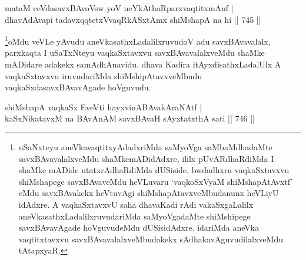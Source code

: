 \begin{shl}
mataM ceVdasavxBAvoV\s sw yoV neYkAthaRparxvaqtitxmAnf | \\
dhavAdAvapi tadavxqqtetxVvaqRkASxtAmx shiMshapA na hi \hfill||  745 ||  
\end{shl}

\begin{artha}
\footnote{uSaNxteyu aneVkavaqtitxyAdadxriMda saMyoVga saMbaMdhadaMte savxBAvavalalxveMdu shaMkemADidAdxre, ililx pUvARdhaRdiMda I shaMke mADide utatxrAdhaRdiMda dUSiside. bwdadhxru vaqkaSxtavxvu shiMshapege savxBAvaveMdu heVLuvaru `vaqkoSxV\s yaM shiMshapAtAvxtf' eMdu savxBAvakekx heVtuvAgi shiMshapAtavxveMbudanunx heVLiyU idAdxre. A vaqkaSxtavxvU saha dhavaKadi rAdi vakaSxgaLalilx aneVkasathxLadalilxruvudariMda saMyoVgadaMte shiMshipege savxBAvavAgade hoVguvudeMdu dUSisidAdxre. idariMda aneVka vaqtitxtavxvu savxBAvavalalxveMbudakekx sAdhakavAguvudilalxveMdu tAtapxyaR.}oMdu veVLe yAvudu aneVkasathxLadalilxruvudoV adu savxBAvavalalx, parxkaqta I uSaTxNteyu vaqkaSxtavxvu savxBAvavalalxveMdu shaMke mADidare adakekx samAdhAnavidu. dhava Kadira itAyxdisathxLadalUlx A vaqkaSxtavxvu iruvudariMda shiMshipAtavxveMbudu vaqkaSxdasavxBAvavAgade hoVguvudu.
\end{artha}


\begin{shl}
shiMshapA vaqkaSx EveVti hayxvinABAvakAraNAtf | \\
kaSxNikatavxM na BAvAnAM savxBAvaH sAyxtatxthA  sati \hfill||  746 || 
\end{shl}

